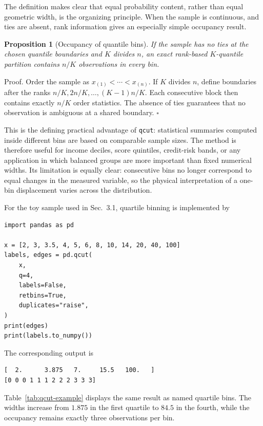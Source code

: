 \documentclass[12pt]{article}
\def\textbf#1{#1}%
\newtheorem{proposition}{Proposition}[section]
\newenvironment{demonstration}
{\par\noindent\textbf{Proof.}}
{\hfill$\square$\par}
\numberwithin{equation}{section}
\begin{document}
The definition makes clear that equal probability content, rather than equal geometric width, is the organizing principle. When the sample is continuous, and ties are absent, rank information gives an especially simple occupancy result.

\begin{proposition}[Occupancy of quantile bins]
If the sample has no ties at the chosen quantile boundaries and $K$ divides $n$, an exact rank-based $K$-quantile partition contains $n/K$ observations in every bin.
\end{proposition}

\begin{demonstration}
Order the sample as $x_{(1)}<\cdots<x_{(n)}$. If $K$ divides $n$, define boundaries after the ranks $n/K,2n/K,\ldots,(K-1)n/K$. Each consecutive block then contains exactly $n/K$ order statistics. The absence of ties guarantees that no observation is ambiguous at a shared boundary.
\end{demonstration}

This is the defining practical advantage of \texttt{qcut}: statistical summaries computed inside different bins are based on comparable sample sizes. The method is therefore useful for income deciles, score quintiles, credit-risk bands, or any application in which balanced groups are more important than fixed numerical widths. Its limitation is equally clear: consecutive bins no longer correspond to equal changes in the measured variable, so the physical interpretation of a one-bin displacement varies across the distribution.

For the toy sample used in Sec.~3.1, quartile binning is implemented by
\begin{lstlisting}[caption={Quartile binning with pandas.qcut.}]
import pandas as pd

x = [2, 3, 3.5, 4, 5, 6, 8, 10, 14, 20, 40, 100]
labels, edges = pd.qcut(
    x,
    q=4,
    labels=False,
    retbins=True,
    duplicates="raise",
)
print(edges)
print(labels.to_numpy())
\end{lstlisting}
The corresponding output is
\begin{lstlisting}[caption={Output of the quartile example.},numbers=none]
[  2.      3.875   7.     15.5   100.   ]
[0 0 0 1 1 1 2 2 2 3 3 3]
\end{lstlisting}

Table~\ref{tab:qcut-example} displays the same result as named quartile bins. The widths increase from $1.875$ in the first quartile to $84.5$ in the fourth, while the occupancy remains exactly three observations per bin.
\end{document}
